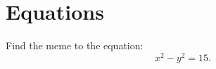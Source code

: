 
\section{Equations}


\begin{problem}
Find the meme to the equation:
\[
x^2 - y^2 = 15.
\]
\end{problem}

